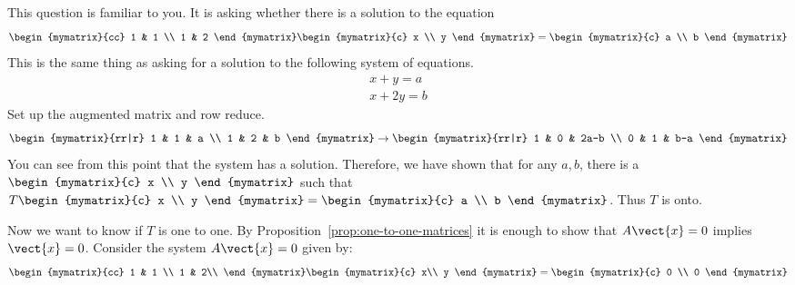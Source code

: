 \begin{solution}
This question is familiar to you. It is asking whether
there is a solution to the equation
\begin{equation*}
\begin{mymatrix}{cc}
1 & 1 \\
1 & 2
\end{mymatrix} \begin{mymatrix}{c}
x \\
y
\end{mymatrix} =\begin{mymatrix}{c}
a \\
b
\end{mymatrix}
\end{equation*}
This is the same thing as asking for a solution to the following system of
equations.
\begin{equation*}
\begin{array}{c}
x+y=a \\
x+2y=b
\end{array}
\end{equation*}
Set up the augmented matrix and row reduce.
\begin{equation}
\begin{mymatrix}{rr|r}
1 & 1 & a \\
1 & 2 & b
\end{mymatrix} \rightarrow \begin{mymatrix}{rr|r}
1 & 0 & 2a-b \\
0 & 1 & b-a
\end{mymatrix}
\label{onto-matrix}
\end{equation}
You can see from this point that the system has a solution. Therefore,
we have shown that for any $a, b$, there is a $
\begin{mymatrix}{c}
x \\
y
\end{mymatrix}$ such that $T\begin{mymatrix}{c}
x \\
y
\end{mymatrix} =\begin{mymatrix}{c}
a \\
b
\end{mymatrix}$.
Thus $T$ is onto.

Now we want to know if $T$ is one to one.
By Proposition~\ref{prop:one-to-one-matrices} it is enough to show that $A\vect{x}=0$ implies $\vect{x}=0$.
Consider the system $A\vect{x}=0$ given by:
\begin{equation*}
\begin{mymatrix}{cc}
1 & 1 \\
1 & 2\\
\end{mymatrix}
\begin{mymatrix}{c}
x\\
y
\end{mymatrix}
=
\begin{mymatrix}{c}
0 \\
0
\end{mymatrix}
\end{equation*}


\end{solution}
